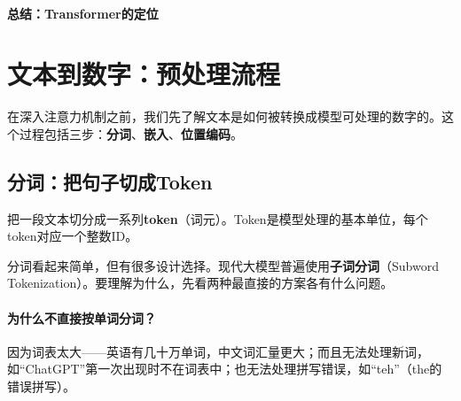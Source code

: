 \paragraph{总结：Transformer的定位}

\begin{center}
\end{center}


\section{文本到数字：预处理流程}

在深入注意力机制之前，我们先了解文本是如何被转换成模型可处理的数字的。这个过程包括三步：\textbf{分词}、\textbf{嵌入}、\textbf{位置编码}。

\subsection{分词：把句子切成Token}

\begin{keyidea}[分词的目标]
把一段文本切分成一系列\textbf{token}（词元）。Token是模型处理的基本单位，每个token对应一个整数ID。
\end{keyidea}

分词看起来简单，但有很多设计选择。现代大模型普遍使用\textbf{子词分词}（Subword Tokenization）。要理解为什么，先看两种最直接的方案各有什么问题。

\paragraph{为什么不直接按单词分词？}

因为词表太大——英语有几十万单词，中文词汇量更大；而且无法处理新词，如“ChatGPT”第一次出现时不在词表中；也无法处理拼写错误，如“teh”（the的错误拼写）。

